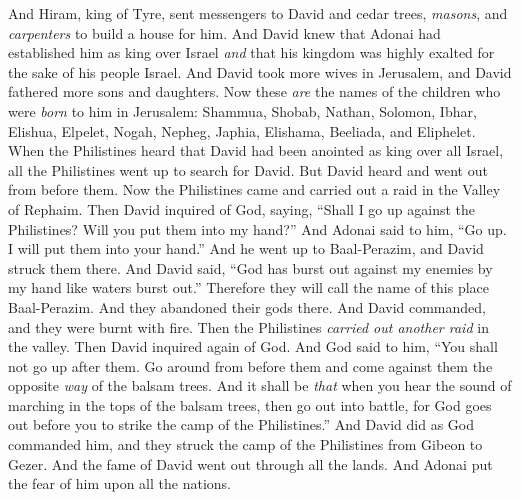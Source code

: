 \begin{biblechapter} %
 And Hiram, king of Tyre, sent messengers to David and cedar trees, \textit{masons}, and \textit{carpenters} to build a house for him.
\verse And David knew that Adonai had established him as king over Israel \textit{and} that his kingdom was highly exalted for the sake of his people Israel.
\verse And David took more wives in Jerusalem, and David fathered more sons and daughters.
\verse Now these \textit{are} the names of the children who were \textit{born} to him in Jerusalem: Shammua, Shobab, Nathan, Solomon,
\verse Ibhar, Elishua, Elpelet,
\verse Nogah, Nepheg, Japhia,
\verse Elishama, Beeliada, and Eliphelet.
 When the Philistines heard that David had been anointed as king over all Israel, all the Philistines went up to search for David. But David heard and went out from before them.
\verse Now the Philistines came and carried out a raid in the Valley of Rephaim.
\verse Then David inquired of God, saying, “Shall I go up against the Philistines? Will you put them into my hand?” And Adonai said to him, “Go up. I will put them into your hand.”
\verse And he went up to Baal-Perazim, and David struck them there. And David said, “God has burst out against my enemies by my hand like waters burst out.” Therefore they will call the name of this place Baal-Perazim.
\verse And they abandoned their gods there. And David commanded, and they were burnt with fire.
\verse Then the Philistines \textit{carried out another raid} in the valley.
\verse Then David inquired again of God. And God said to him, “You shall not go up after them. Go around from before them and come against them the opposite \textit{way} of the balsam trees.
\verse And it shall be \textit{that} when you hear the sound of marching in the tops of the balsam trees, then go out into battle, for God goes out before you to strike the camp of the Philistines.”
\verse And David did as God commanded him, and they struck the camp of the Philistines from Gibeon to Gezer.
\verse And the fame of David went out through all the lands. And Adonai put the fear of him upon all the nations.
\end{biblechapter}

